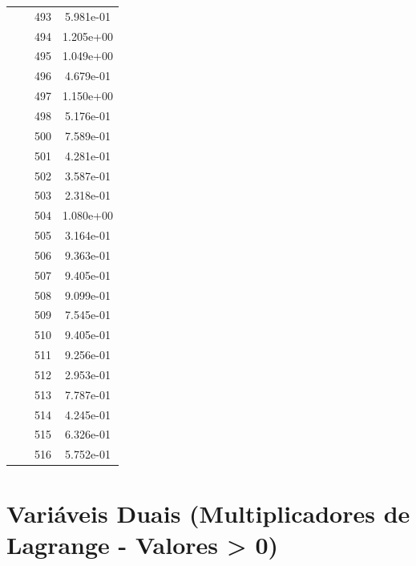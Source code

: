 \documentclass[12pt]{article}
\begin{document}
\begin{longtable}{@{}cccc@{}}
 &  & 493 & 5.981e-01 \\
 &  & 494 & 1.205e+00 \\
 &  & 495 & 1.049e+00 \\
 &  & 496 & 4.679e-01 \\
 &  & 497 & 1.150e+00 \\
 &  & 498 & 5.176e-01 \\
 &  & 500 & 7.589e-01 \\
 &  & 501 & 4.281e-01 \\
 &  & 502 & 3.587e-01 \\
 &  & 503 & 2.318e-01 \\
 &  & 504 & 1.080e+00 \\
 &  & 505 & 3.164e-01 \\
 &  & 506 & 9.363e-01 \\
 &  & 507 & 9.405e-01 \\
 &  & 508 & 9.099e-01 \\
 &  & 509 & 7.545e-01 \\
 &  & 510 & 9.405e-01 \\
 &  & 511 & 9.256e-01 \\
 &  & 512 & 2.953e-01 \\
 &  & 513 & 7.787e-01 \\
 &  & 514 & 4.245e-01 \\
 &  & 515 & 6.326e-01 \\
 &  & 516 & 5.752e-01 \\

\bottomrule
\end{longtable}


\section{Variáveis Duais (Multiplicadores de Lagrange - Valores > 0)}
\end{document}
